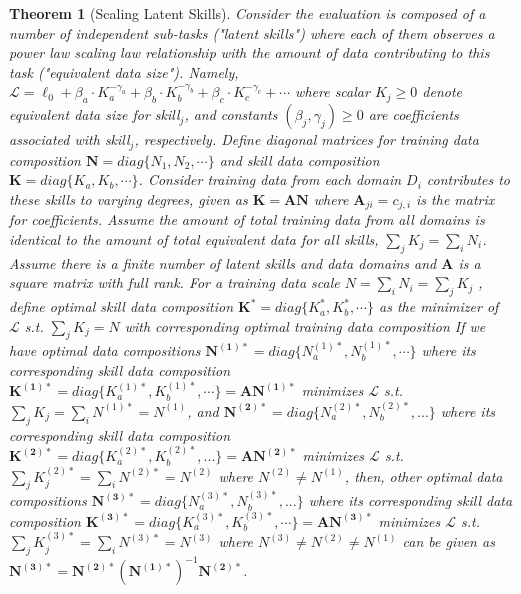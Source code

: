 \documentclass{article} %
\newtheorem{theorem}{Theorem}
\begin{document}
\begin{appendices}{}
\renewcommand{\thetheorem}{2}
\begin{theorem} [Scaling Latent Skills]
Consider the evaluation is composed of a number of \textit{independent} sub-tasks ("latent skills") where each of them observes a power law scaling law relationship with the amount of data contributing to this task ("equivalent data size"). Namely, 
$
\mathcal{L} =\ell_0+\beta_a\cdot K_a^{-\gamma_a}+\beta_b\cdot K_b^{-\gamma_b}+\beta_c\cdot K_c^{-\gamma_c} + \cdots
$
where scalar $K_j\geq 0$ denote equivalent data size for \textit{skill$_j$}, and constants $(\beta_j, \gamma_j)\geq 0$ are coefficients associated with \textit{skill$_j$}, respectively.
Define diagonal matrices for training data composition $\mathbf{N}=diag\{N_1,N_2, \cdots\}$ and skill data composition $\mathbf{K}=diag\{K_a,K_b, \cdots\}$. Consider training data from each domain $D_i$ contributes to these skills to varying degrees, given as $\mathbf{K} = \mathbf{A}\mathbf{N}$ where $\mathbf{A}_{ji}=c_{j,i}$ is the matrix for coefficients. 
Assume the amount of total training data from all domains is identical to the amount of total equivalent data for all skills, $\sum_j K_j = \sum_i N_i$. Assume there is a finite number of latent skills and data domains and $\mathbf{A}$ is a square matrix with full rank. 
For a training data scale $N=\sum_i N_i=\sum_j K_j$
, define optimal skill data composition $\mathbf{K^*}=diag\{K_a^*, K_b^*, \cdots\}$ as the minimizer of $\mathcal{L}$ s.t. $\sum_j K_j=N$ with corresponding optimal training data composition 
If we have optimal data compositions $\mathbf{N^{(1)*}}=diag\{N_a^{(1)*}, N_b^{(1)*}, \cdots\}$ 
where its corresponding skill data composition $\mathbf{K^{(1)*}}=diag\{K_a^{(1)*}, K_b^{(1)*}, \cdots\}=\mathbf{A}\mathbf{N^{(1)*}}$ minimizes $\mathcal{L}$ s.t. $\sum_j K_j=\sum_i N^{(1)*}=N^{(1)}$, and $\mathbf{N^{(2)*}}=diag\{N_a^{(2)*}, N_b^{(2)*},...\}$ 
where its corresponding skill data composition $\mathbf{K^{(2)*}}=diag\{K_a^{(2)*}, K_b^{(2)*},...\}=\mathbf{A}\mathbf{N^{(2)*}}$ minimizes $\mathcal{L}$ s.t. $\sum_j K_j^{(2)*}=\sum_i N^{(2)*}=N^{(2)}$ where $N^{(2)}\neq N^{(1)}$, then, other optimal data compositions $\mathbf{N^{(3)*}}=diag\{N_a^{(3)*}, N_b^{(3)*},...\}$ 
where its corresponding skill data composition $\mathbf{K^{(3)*}}=diag\{K_a^{(3)*}, K_b^{(3)*}, \cdots\}=\mathbf{A}\mathbf{N^{(3)*}}$ minimizes $\mathcal{L}$ s.t. $\sum_j K_j^{(3)*}=\sum_i N^{(3)*}=N^{(3)}$ where $N^{(3)}\neq N^{(2)}\neq N^{(1)}$ can be given as
$
\mathbf{N^{(3)*}} = \mathbf{N^{(2)*}}(\mathbf{N^{(1)*}})^{-1}\mathbf{N^{(2)*}}
$.
\end{theorem}

\end{appendices}
\end{document}
